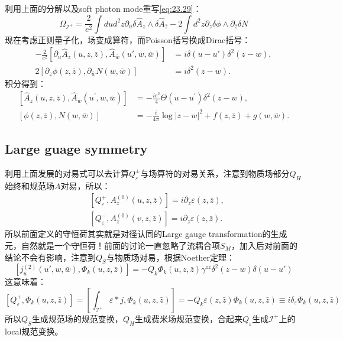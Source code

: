 利用上面的分解以及soft photon mode重写\ref{eq:23.29}：
\begin{equation}
	\Omega_{\mathcal{I}^{+}}=\frac{2}{e^{2}}\int dud^{2}z\partial_{u}\delta\hat{A}_{z}\wedge\delta\hat{A}_{\bar{z}}-2\int d^{2}z\partial_{z}\delta\phi\wedge\partial_{\bar{z}}\delta N
\end{equation}
现在考虑正则量子化，场变成算符，而Poisson括号换成Dirac括号：
\begin{equation}
	\begin{aligned}-\frac{2}{e^2}\left[\partial_u\hat A_z(u,z,\bar z),\hat A_{\bar w}(u',w,\bar w)\right]&=i\delta(u-u')\delta^2(z-w),\\2\left[\partial_z\phi(z,\bar z),\partial_{\bar w}N(w,\bar w)\right]&=i\delta^2(z-w).\end{aligned}
\end{equation}
积分得到：
\begin{equation}
	\begin{aligned}
		\left[\hat{A}_{z}(u,z,\bar{z}),\hat{A}_{\bar{w}}(u^{\prime},w,\bar{w})\right]& =-\frac{ie^{2}}{4}\Theta(u-u^{\prime})\delta^{2}(z-w),  \\
		[\phi(z,\bar{z}),N(w,\bar{w})]& =-\frac{i}{4\pi}\log|z-w|^{2}+f(z,\bar{z})+g(w,\bar{w}). 
	\end{aligned}
\end{equation}

\subsection{Large guage symmetry}
利用上面发展的对易式可以去计算$Q_\varepsilon^{\pm}$与场算符的对易关系，注意到物质场部分$Q_H$始终和规范场$A$对易，所以：
\begin{equation}
	\begin{aligned}&\left[Q_{\varepsilon}^{+},A_{z}^{(0)}(u,z,\bar{z})\right]=i\partial_{z}\varepsilon(z,\bar{z}),\\&\left[Q_{\varepsilon}^{-},A_{z}^{(0)}(v,z,\bar{z})\right]=i\partial_{z}\varepsilon(z,\bar{z}).\end{aligned}
\end{equation}
所以前面定义的守恒荷其实就是对径认同的Large gauge transformation的生成元，自然就是一个守恒荷！前面的讨论一直忽略了流耦合项$S_M$，加入后对前面的结论不会有影响，注意到$Q_S$与物质场对易，根据Noether定理：
\begin{equation}
	\left[j_{u}^{(2)}(u',w,\bar{w}),\Phi_{k}(u,z,\bar{z})\right]=-Q_{k}\Phi_{k}(u,z,\bar{z})\gamma^{z\bar{z}}\delta^{2}(z-w)\delta(u-u')
\end{equation}
这意味着：
\begin{equation}\label{23.36}
	\left[Q_\varepsilon^+,\Phi_k(u,z,\bar{z})\right]=\left[\int_{\mathcal{I}^+}\varepsilon*j,\Phi_k(u,z,\bar{z})\right]=-Q_k\varepsilon(z,\bar{z})\Phi_k(u,z,\bar{z})\equiv i\delta_\varepsilon\Phi_k(u,z,\bar{z})
\end{equation}
所以$Q_S$生成规范场的规范变换，$Q_H$生成费米场规范变换，合起来$Q_\varepsilon$生成$\mathcal{I}^+$上的local规范变换。
